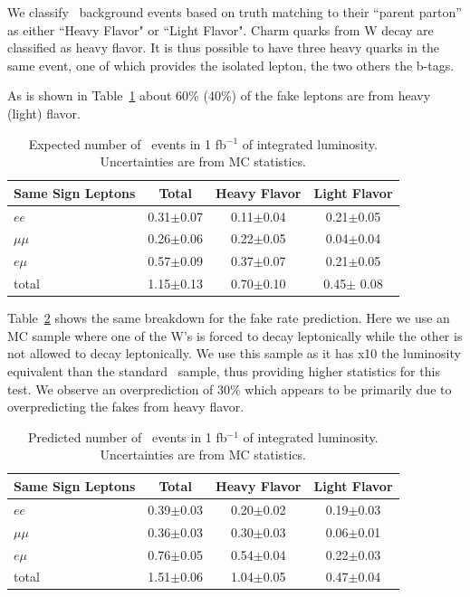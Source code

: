 We classify \ttbar\ background events based on truth matching to their ``parent parton''
as either ``Heavy Flavor" or ``Light Flavor". Charm quarks from W decay are classified as heavy flavor.
It is thus possible to have three heavy quarks in the same event, one of which provides the isolated lepton,
the two others the b-tags.

As is shown in Table~\ref{tab:fakeOrigin1}  about 60\% (40\%) of the fake leptons are from heavy (light) flavor.


\begin{table}[hbt]
\begin{center}
\begin{tabular}{|l|c|c|c|}\hline
Same Sign Leptons & Total  & Heavy Flavor & Light Flavor  \\ \hline

$ee$ & 0.31$\pm$0.07 &  0.11$\pm$0.04 & 0.21$\pm$0.05  \\
$\mu\mu$ & 0.26$\pm$0.06 & 0.22$\pm$0.05 & 0.04$\pm$0.04 \\
$e\mu$ & 0.57$\pm$0.09 & 0.37$\pm$0.07 & 0.21$\pm$0.05 \\
total & 1.15$\pm$0.13 & 0.70$\pm$0.10 & 0.45$\pm$ 0.08 \\ \hline
\end{tabular}
\caption{ Expected number of \ttbar\ events in 1 fb$^{-1}$ of integrated luminosity. Uncertainties are from MC statistics.\label{tab:fakeOrigin1}}
\end{center}
\end{table}

Table~\ref{tab:fakeOrigin2} shows the same breakdown for the fake rate prediction.
Here we use an MC sample where one of the W's is forced to decay leptonically while the other is not allowed to decay
leptonically.
We use this sample as it has x10 the luminosity equivalent than the standard \ttbar\ sample, thus providing higher statistics for 
this test. We observe an overprediction of 30\% which appears to be primarily due to overpredicting the fakes from heavy flavor.

\begin{table}[hbt]
\begin{center}
\begin{tabular}{|l|c|c|c|}\hline
Same Sign Leptons & Total &  Heavy Flavor & Light Flavor\\ \hline
$ee$ & 0.39$\pm$0.03 & 0.20$\pm$0.02 & 0.19$\pm$0.03 \\
$\mu\mu$ & 0.36$\pm$0.03 & 0.30$\pm$0.03 & 0.06$\pm$0.01 \\
$e\mu$ & 0.76$\pm$0.05 & 0.54$\pm$0.04 & 0.22$\pm$0.03 \\
total & 1.51$\pm$0.06 & 1.04$\pm$0.05 & 0.47$\pm$0.04  \\ \hline
\end{tabular}
\caption{ Predicted number of \ttbar\ events in 1 fb$^{-1}$ of integrated luminosity. Uncertainties are from MC statistics.\label{tab:fakeOrigin2}}
\end{center}
\end{table}

